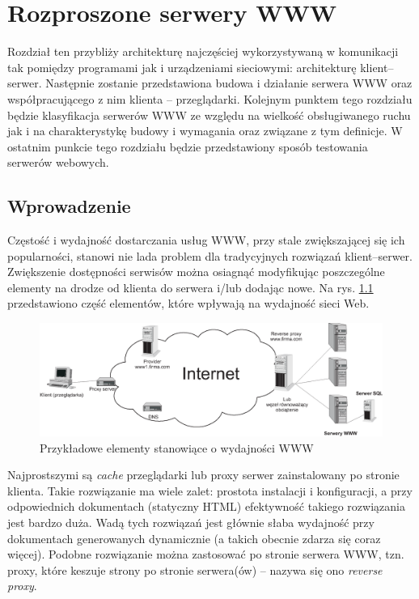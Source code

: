 \chapter{Rozproszone serwery WWW}
\label{r03}
Rozdział ten przybliży architekturę najczęściej wykorzystywaną w komunikacji tak pomiędzy programami jak i
urządzeniami sieciowymi: architekturę klient--serwer. Następnie zostanie przedstawiona budowa i działanie serwera
WWW oraz współpracującego z nim klienta -- przeglądarki. Kolejnym punktem tego rozdziału będzie klasyfikacja
serwerów WWW ze względu na wielkość obsługiwanego ruchu jak i na charakterystykę budowy i wymagania oraz
związane z tym definicje. W ostatnim punkcie tego rozdziału będzie przedstawiony sposób testowania serwerów webowych.

\section{Wprowadzenie}
Częstość i wydajność dostarczania usług WWW, przy stale zwiększającej się ich popularności, 
stanowi nie lada problem dla tradycyjnych rozwiązań klient--serwer. Zwiększenie dostępności
serwisów można osiagnąć modyfikując poszczególne elementy na drodze od klienta do serwera 
i/lub dodając nowe. Na rys. \ref{www} przedstawiono część elementów, które wpływają na wydajność 
sieci Web.
\begin{figure}[h]
\centering
\includegraphics[width=\textwidth]{./rysunki/www.eps}
\caption{Przykładowe elementy stanowiące o wydajności WWW}
\label{www}
\end{figure}

Najprostszymi są \emph{cache} przeglądarki lub proxy serwer zainstalowany
po stronie klienta. Takie rozwiązanie ma wiele zalet: prostota instalacji i konfiguracji, a przy
odpowiednich dokumentach (statyczny HTML) efektywność takiego rozwiązania jest bardzo duża. 
Wadą tych rozwiązań jest głównie słaba wydajność przy dokumentach generowanych dynamicznie
(a takich obecnie zdarza się coraz więcej). Podobne rozwiązanie można zastosować po stronie 
serwera WWW, tzn. proxy, które keszuje strony po stronie serwera(ów) -- nazywa się ono 
\emph{reverse proxy}. 

